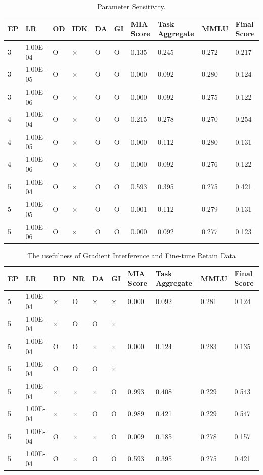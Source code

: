 \documentclass[11pt]{article}
\begin{document}
\begin{table}[!t]
  \centering
    \begin{tabular}{|l|l|l|l|l|l|l|l|l|l|}
    \hline
        EP & LR & OD & IDK & DA & GI & MIA Score & Task Aggregate & MMLU & Final Score \\ \hline
        3 & 1.00E-04 & O & × & O & O & 0.135 & 0.245 & 0.272 & 0.217 \\ \hline
        3 & 1.00E-05 & O & × & O & O & 0.000 & 0.092 & 0.280 & 0.124 \\ \hline
        3 & 1.00E-06 & O & × & O & O & 0.000 & 0.092 & 0.275 & 0.122 \\ \hline
        4 & 1.00E-04 & O & × & O & O & 0.215 & 0.278 & 0.270 & 0.254 \\ \hline
        4 & 1.00E-05 & O & × & O & O & 0.000 & 0.112 & 0.280 & 0.131 \\ \hline
        4 & 1.00E-06 & O & × & O & O & 0.000 & 0.092 & 0.276 & 0.122 \\ \hline
        5 & 1.00E-04 & O & × & O & O & 0.593 & 0.395 & 0.275 & 0.421 \\ \hline
        5 & 1.00E-05 & O & × & O & O & 0.001 & 0.112 & 0.279 & 0.131 \\ \hline
        5 & 1.00E-06 & O & × & O & O & 0.000 & 0.092 & 0.277 & 0.123 \\ \hline
    \end{tabular}
  \caption{
    Parameter Sensitivity.  }
\label{tab:AS1}
\end{table}


\begin{table}[!t]
  \centering
    \begin{tabular}{|l|l|l|l|l|l|l|l|l|l|}
    \hline
        EP & LR & RD & NR & DA & GI & MIA Score & Task Aggregate & MMLU & Final Score \\ \hline
        5 & 1.00E-04 & × & O & × & × & 0.000 & 0.092 & 0.281 & 0.124 \\ \hline
        5 & 1.00E-04 & × & O & O & × & ~ & ~ & ~ & ~ \\ \hline
        5 & 1.00E-04 & O & O & × & × & 0.000 & 0.124 & 0.283 & 0.135 \\ \hline
        5 & 1.00E-04 & O & O & O & × & ~ & ~ & ~ & ~ \\ \hline
        5 & 1.00E-04 & × & × & × & O & 0.993 & 0.408 & 0.229 & 0.543 \\ \hline
        5 & 1.00E-04 & × & × & O & O & 0.989 & 0.421 & 0.229 & 0.547 \\ \hline
        5 & 1.00E-04 & O & × & × & O & 0.009 & 0.185 & 0.278 & 0.157 \\ \hline
        5 & 1.00E-04 & O & × & O & O & 0.593 & 0.395 & 0.275 & 0.421 \\ \hline
    \end{tabular}
  \caption{
    The usefulness of Gradient Interference and Fine-tune Retain Data
  }
  \label{tab:AS2}
\end{table}
\end{document}
